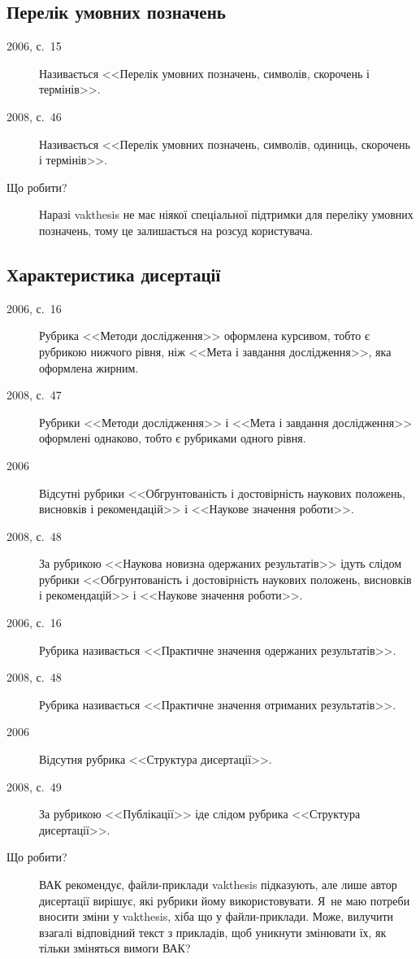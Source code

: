 \documentclass[a4paper]{article}
\newcommand{\vakthesis}{\textsf{vakthesis}}
\begin{document}
\subsection{Перелік умовних позначень}

\begin{description}
\item[2006, с.~15] Називається <<Перелік умовних позначень, символів,
  скорочень і термінів>>.

\item[2008, с.~46] Називається <<Перелік умовних позначень, символів,
  одиниць, скорочень і термінів>>.

\item[Що робити?] Наразі \vakthesis{} не має ніякої спеціальної
  підтримки для переліку умовних позначень, тому це залишається на
  розсуд користувача.
\end{description}

\subsection{Характеристика дисертації}

\begin{description}
\item[2006, с.~16] Рубрика <<Методи дослідження>> оформлена курсивом,
  тобто є рубрикою нижчого рівня, ніж <<Мета і завдання дослідження>>,
  яка оформлена жирним.

\item[2008, с.~47] Рубрики <<Методи дослідження>> і <<Мета і завдання
  дослідження>> оформлені однаково, тобто є рубриками одного рівня.

\item[2006] Відсутні рубрики <<Обгрунтованість і достовірність
  наукових положень, висновків і рекомендацій>> і <<Наукове значення
  роботи>>.

\item[2008, с.~48] За рубрикою <<Наукова новизна одержаних
  результатів>> ідуть слідом рубрики <<Обгрунтованість і достовірність
  наукових положень, висновків і рекомендацій>> і <<Наукове значення
  роботи>>.

\item[2006, с.~16] Рубрика називається <<Практичне значення одержаних
  результатів>>.

\item[2008, с.~48] Рубрика називається <<Практичне значення отриманих
  результатів>>.

\item[2006] Відсутня рубрика <<Структура дисертації>>.

\item[2008, с.~49] За рубрикою <<Публікації>> іде слідом рубрика
  <<Структура дисертації>>.

\item[Що робити?] ВАК рекомендує, файли-приклади \vakthesis{}
  підказують, але лише автор дисертації вирішує, які рубрики йому
  використовувати. Я~не маю потреби вносити зміни у \vakthesis{}, хіба
  що у файли-приклади. Може, вилучити взагалі відповідний текст з
  прикладів, щоб уникнути змінювати їх, як тільки зміняться вимоги
  ВАК?
\end{description}
\end{document}
